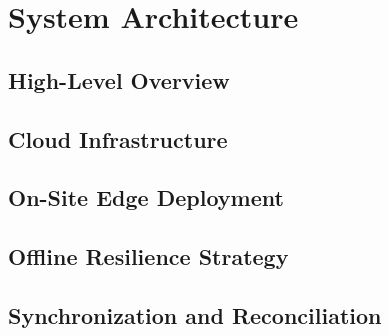 \chapter{System Architecture}
\label{chap:architecture}


\section{High-Level Overview}
\label{sec:high-level-overview}

\section{Cloud Infrastructure}
\label{sec:cloud-infrastructure}

\section{On-Site Edge Deployment}
\label{sec:edge-deployment}

\section{Offline Resilience Strategy}
\label{sec:offline-resilience}

\section{Synchronization and Reconciliation}
\label{sec:sync-reconciliation}
